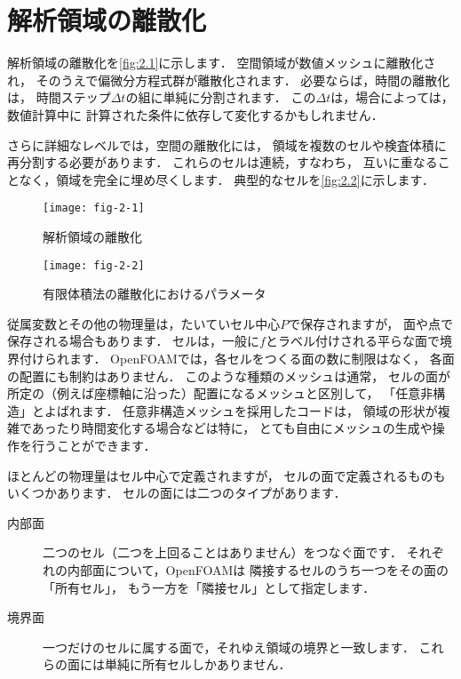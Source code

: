 \section{解析領域の離散化}
\label{sec:2.3}
解析領域の離散化を\autoref{fig:2.1}に示します．
空間領域が数値メッシュに離散化され，
そのうえで偏微分方程式群が離散化されます．
必要ならば，時間の離散化は，
時間ステップ$\Delta{t}$の組に単純に分割されます．
この$\Delta{t}$は，場合によっては，数値計算中に
計算された条件に依存して変化するかもしれません．

さらに詳細なレベルでは，空間の離散化には，
領域を複数のセルや検査体積に再分割する必要があります．
これらのセルは連続，すなわち，
互いに重なることなく，領域を完全に埋め尽くします．
典型的なセルを\autoref{fig:2.2}に示します．


\begin{figure}[ht]
 \texttt{[image: fig-2-1]}
 \caption{解析領域の離散化}
 \label{fig:2.1}
\end{figure}


\begin{figure}[ht]
 \texttt{[image: fig-2-2]}
 \caption{有限体積法の離散化におけるパラメータ}
 \label{fig:2.2}
\end{figure}


従属変数とその他の物理量は，たいていセル中心$P$で保存されますが，
面や点で保存される場合もあります．
セルは，一般に$f$とラベル付けされる平らな面で境界付けられます．
OpenFOAMでは，各セルをつくる面の数に制限はなく，
各面の配置にも制約はありません．
このような種類のメッシュは通常，
セルの面が所定の（例えば座標軸に沿った）配置になるメッシュと区別して，
「任意非構造」とよばれます．
任意非構造メッシュを採用したコードは，
領域の形状が複雑であったり時間変化する場合などは特に，
とても自由にメッシュの生成や操作を行うことができます．

ほとんどの物理量はセル中心で定義されますが，
セルの面で定義されるものもいくつかあります．
セルの面には二つのタイプがあります．
\begin{description}
 \item[内部面] 二つのセル（二つを上回ることはありません）をつなぐ面です．
            それぞれの内部面について，OpenFOAMは
            隣接するセルのうち一つをその面の「所有セル」，
            もう一方を「隣接セル」として指定します．
 \item[境界面] 一つだけのセルに属する面で，それゆえ領域の境界と一致します．
            これらの面には単純に所有セルしかありません．
\end{description}


